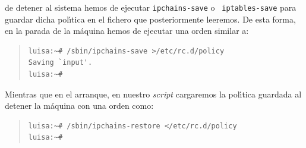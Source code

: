 de detener al sistema hemos de ejecutar {\tt ipchains-save} o {\tt 
iptables-save} para guardar dicha pol\'{\i}tica en el fichero que posteriormente
leeremos. De esta forma, en la parada de la m\'aquina hemos de ejecutar una
orden similar a:
\begin{quote}
\begin{verbatim}
luisa:~# /sbin/ipchains-save >/etc/rc.d/policy
Saving `input'.
luisa:~# 
\end{verbatim}
\end{quote}
Mientras que en el arranque, en nuestro {\it script} cargaremos la pol\'{\i}tica
guardada al detener la m\'aquina con una orden como:
\begin{quote}
\begin{verbatim}
luisa:~# /sbin/ipchains-restore </etc/rc.d/policy
luisa:~#
\end{verbatim}
\end{quote}
